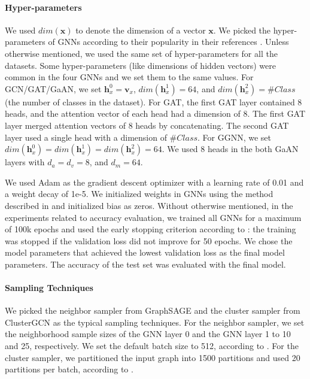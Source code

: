 \paragraph{Hyper-parameters}
\label{sec:hyper-parameters}

We used $dim(\boldsymbol{x})$ to denote the dimension of a vector $\boldsymbol{x}$.
%
We picked the hyper-parameters of GNNs according to their popularity in their references \cite{kipf2017_gcn, li2015_ggnn, huang2018_gat, zhang2018_gaan}.
%
Unless otherwise mentioned, we used the same set of hyper-parameters for all the datasets. 
%
Some hyper-parameters (like dimensions of hidden vectors) were common in the four GNNs and we set them to the same values.
%
For GCN/GAT/GaAN, we set $\boldsymbol{h}^0_x = \boldsymbol{v}_x$, $dim(\boldsymbol{h}^1_x)=64$, and $dim(\boldsymbol{h}^2_x)=\#Class$ (the number of classes in the dataset).
%
For GAT, the first GAT layer contained 8 heads, and the attention vector of each head had a dimension of 8.
%
The first GAT layer merged attention vectors of 8 heads by concatenating.
%
The second GAT layer used a single head with a dimension of $\#Class$.
%
For GGNN, we set $dim(\boldsymbol{h}^0_x) = dim(\boldsymbol{h}^1_x) = dim(\boldsymbol{h}^2_x) = 64$.
%
We used 8 heads in the both GaAN layers with $d_a=d_v=8$, and $d_m=64$.

We used Adam \cite{diederik2015_adam} as the gradient descent optimizer with a learning rate of 0.01 and a weight decay of 1e-5.
%
We initialized weights in GNNs using the method described in \cite{xavier2010_glorot} and initialized bias as zeros.
%
Without otherwise mentioned, in the experiments related to accuracy evaluation, we trained all GNNs for a maximum of 100k epochs and used the early stopping criterion according to \cite{shchur2018_pitfall_of_gnn}:
%
the training was stopped if the validation loss did not improve for 50 epochs.
%
We chose the model parameters that achieved the lowest validation loss as the final model parameters.
%
The accuracy of the test set was evaluated with the final model.

\paragraph{Sampling Techniques}

We picked the neighbor sampler from GraphSAGE \cite{hamilton2017_graphsage} and the cluster sampler from ClusterGCN \cite{chiang2019_cluster_gcn} as the typical sampling techniques.
%
For the neighbor sampler, we set the neighborhood sample sizes of the GNN layer 0 and the GNN layer 1 to 10 and 25, respectively.
%
We set the default batch size to 512, according to \cite{hamilton2017_graphsage}.
%
For the cluster sampler, we partitioned the input graph into 1500 partitions and used 20 partitions per batch, according to \cite{chiang2019_cluster_gcn}.

